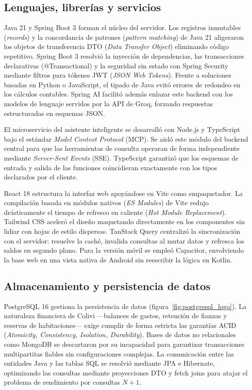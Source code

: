 \subsection{Lenguajes, librerías y servicios}
\label{subsec:lenguajes_marcos_servicios}

    Java 21 y Spring Boot 3 forman el núcleo del servidor. Los registros inmutables (\emph{records}) y la concordancia de patrones (\emph{pattern matching}) de Java 21 aligeraron los objetos de transferencia DTO (\emph{Data Transfer Object}) eliminando código repetitivo. Spring Boot 3 resolvió la inyección de dependencias, las transacciones declarativas (@Transactional) y la seguridad sin estado con Spring Security mediante filtros para tókenes JWT (\emph{JSON Web Tokens}). Frente a soluciones basadas en Python o JavaScript, el tipado de Java evitó errores de redondeo en los cálculos contables. Spring AI facilitó además enlazar este backend con los modelos de lenguaje servidos por la API de Groq, forzando respuestas estructuradas en esquemas JSON.

    El microservicio del asistente inteligente se desarrolló con Node.js y TypeScript bajo el estándar \emph{Model Context Protocol} (MCP). Se aisló este módulo del backend central para que las herramientas de consulta operaran de forma independiente mediante \emph{Server-Sent Events} (SSE). TypeScript garantizó que los esquemas de entrada y salida de las funciones coincidieran exactamente con los tipos declarados por el cliente.

    React 18 estructura la interfaz web apoyándose en Vite como empaquetador. La compilación basada en módulos nativos (\emph{ES Modules}) de Vite redujo drásticamente el tiempo de refresco en caliente (\emph{Hot Module Replacement}). Tailwind CSS aceleró el diseño maquetando directamente en los componentes sin lidiar con hojas de estilo dispersas. TanStack Query centralizó la sincronización con el servidor: resuelve la caché, invalida consultas al mutar datos y refresca los saldos en segundo plano. Para la versión móvil se empleó Capacitor, envolviendo la base web en una vista nativa de Android sin reescribir la lógica en Kotlin.

\subsection{Almacenamiento y persistencia de datos}
\label{subsec:almacenamiento_persistencia}

    PostgreSQL 16 gestiona la persistencia de datos (figura~\ref{fig:postgresql_logo}). La naturaleza financiera de Colivi —balances de gastos, retención de fianzas y reservas de habitaciones— exige cumplir de forma estricta las garantías ACID (\emph{Atomicity, Consistency, Isolation, Durability}). Bases de datos no relacionales como MongoDB se descartaron por su incapacidad para garantizar transacciones multipartitas fiables sin configuraciones complejas. La comunicación entre las entidades Java y las tablas SQL se resolvió mediante JPA e Hibernate, optimizando las consultas mediante proyecciones DTO y fetch joins para atajar el problema de rendimiento por consultas $N+1$.

